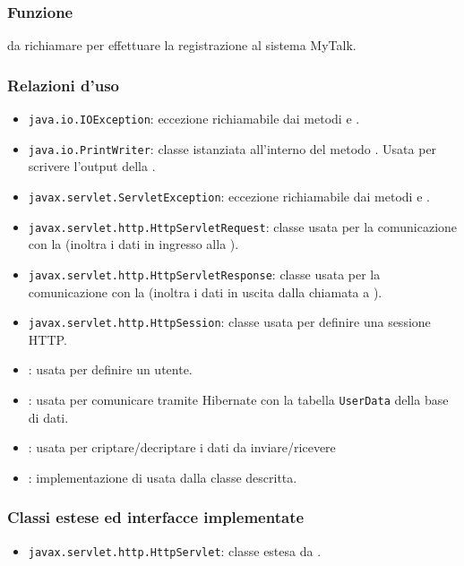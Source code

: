 
\subsubsection*{Funzione}
 da richiamare per effettuare la registrazione al sistema MyTalk.

\subsubsection*{Relazioni d'uso}
\begin{itemize}
	\item \texttt{java.io.IOException}: eccezione richiamabile dai metodi  e .
	\item \texttt{java.io.PrintWriter}: classe istanziata all'interno del metodo . Usata per scrivere l'output della .
	\item \texttt{javax.servlet.ServletException}: eccezione richiamabile dai metodi  e .
	\item \texttt{javax.servlet.http.HttpServletRequest}:  classe usata per la comunicazione con la  (inoltra i dati in ingresso alla ).
	\item \texttt{javax.servlet.http.HttpServletResponse}: classe usata per la comunicazione con la  (inoltra i dati in uscita dalla chiamata a ).
	\item \texttt{javax.servlet.http.HttpSession}: classe usata per definire una sessione HTTP.
	\item {}: usata per definire un utente.
	\item {}: usata per comunicare tramite Hibernate con la tabella \texttt{UserData} della base di dati.
	\item {}: usata per criptare/decriptare i dati da inviare/ricevere
	\item {}: implementazione di  usata dalla classe descritta.
	
\end{itemize}

\subsubsection*{Classi estese ed interfacce implementate}
\begin{itemize}
	\item \texttt{javax.servlet.http.HttpServlet}: classe estesa da .
\end{itemize}

